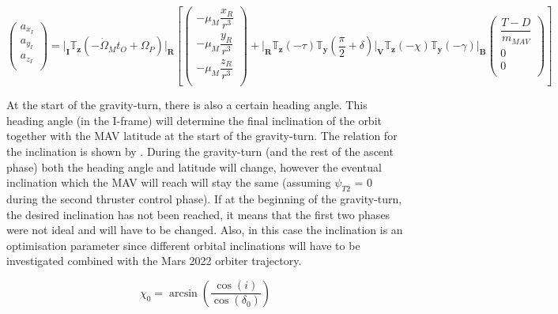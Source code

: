 \begin{equation} \label{eq:grav_acc_eom}
\begin{pmatrix}
a_{x_{I}}\\
a_{y_{I}}\\
a_{z_{I}}\\
\end{pmatrix}
=
\Bigg|_{\mathbf{I}}\mathbb{T}_{\mathbf{z}}\left(-\dot{\Omega}_{M}t_{O}+\Omega_{P}\right)\Bigg|_{\mathbf{R}}\left[
\begin{pmatrix}
-\mu_{M}\dfrac{x_{R}}{r^{3}}\\
-\mu_{M}\dfrac{y_{R}}{r^{3}}\\
-\mu_{M}\dfrac{z_{R}}{r^{3}}\\
\end{pmatrix}
+\Bigg|_{\mathbf{R}}\mathbb{T}_{\mathbf{z}}\left(-\tau\right)\mathbb{T}_{\mathbf{y}}\left(\dfrac{\pi}{2}+\delta\right)\Bigg|_{\mathbf{V}}\mathbb{T}_{\mathbf{z}}\left(-\chi\right)\mathbb{T}_{\mathbf{y}}\left(-\gamma\right)\Bigg|_{\mathbf{B}}
\begin{pmatrix}
\dfrac{T-D}{m_{MAV}}\\
0\\
0\\
\end{pmatrix}
\right]
\end{equation}

At the start of the gravity-turn, there is also a certain heading angle. This heading angle (in the I-frame) will determine the final inclination of the orbit together with the \ac{MAV} latitude at the start of the gravity-turn. The relation for the inclination is shown by . During the gravity-turn (and the rest of the ascent phase) both the heading angle and latitude will change, however the eventual inclination which the \ac{MAV} will reach will stay the same (assuming $\psi_{T2}$ = 0 during the second thruster control phase). If at the beginning of the gravity-turn, the desired inclination has not been reached, it means that the first two phases were not ideal and will have to be changed. Also, in this case the inclination is an optimisation parameter since different orbital inclinations will have to be investigated combined with the Mars 2022 orbiter trajectory.


\begin{equation} \label{eq:heading_incl_rel}
\chi_{0}=\arcsin\left(\dfrac{\cos\left(i\right)}{\cos\left(\delta_{0}\right)}\right)
\end{equation}

